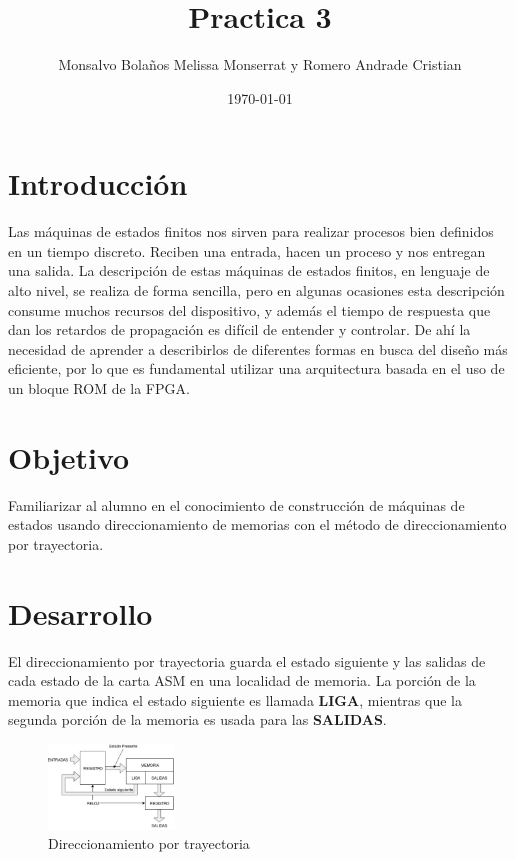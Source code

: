 \documentclass[table]{scrartcl}
\author{Monsalvo Bolaños Melissa Monserrat y Romero Andrade Cristian}
\date{\today}
\title{Practica 3}
\begin{document}

\date{}
\maketitle{}
\tableofcontents{}
\section{Introducción}
\label{sec:org6bd500f}
Las máquinas de estados finitos nos sirven para realizar procesos bien
definidos en un tiempo discreto. Reciben una entrada, hacen un proceso y nos
entregan una salida.
La descripción de estas máquinas de estados finitos, en lenguaje de alto nivel,
se realiza de forma sencilla, pero en algunas ocasiones esta descripción
consume muchos recursos del dispositivo, y además el tiempo de respuesta que
dan los retardos de propagación es difícil de entender y controlar. De ahí la
necesidad de aprender a describirlos de diferentes formas en busca del diseño
más eficiente, por lo que es fundamental utilizar una arquitectura basada en el
uso de un bloque ROM de la FPGA.
\section{Objetivo}
\label{sec:org8bfa7f0}
Familiarizar al alumno en el conocimiento de construcción de máquinas de
estados usando direccionamiento de memorias con el método de
direccionamiento por trayectoria.
\section{Desarrollo}
\label{sec:orgac7043c}
El direccionamiento por trayectoria guarda el estado siguiente y las salidas de
cada estado de la carta ASM en una localidad de memoria. La porción de la
memoria que indica el estado siguiente es llamada \textbf{LIGA}, mientras que la
segunda porción de la memoria es usada para las \textbf{SALIDAS}.
\begin{figure}[htbp]
  \centering
  \includegraphics[width=0.3\textwidth]{./img/1.png}
  \caption{Direccionamiento por trayectoria}
\end{figure}
\end{document}
